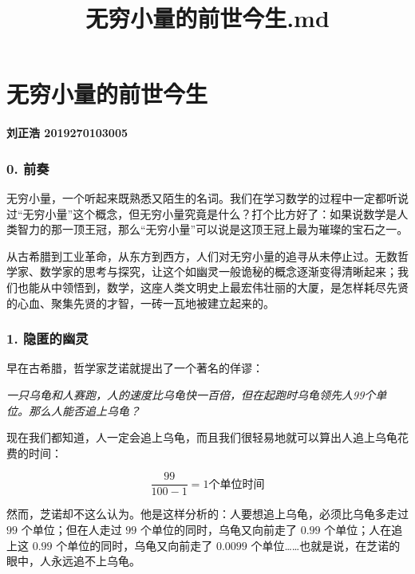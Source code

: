 \documentclass[
]{article}
\title{无穷小量的前世今生.md}
\author{}
\date{}
\begin{document}
\maketitle

\hypertarget{header-n0}{%
\section{无穷小量的前世今生}\label{header-n0}}

\hypertarget{header-n2}{%
\paragraph{刘正浩 2019270103005}\label{header-n2}}

\hypertarget{header-n3}{%
\subsubsection{0. 前奏}\label{header-n3}}

无穷小量，一个听起来既熟悉又陌生的名词。我们在学习数学的过程中一定都听说过``无穷小量''这个概念，但无穷小量究竟是什么？打个比方好了：如果说数学是人类智力的那一顶王冠，那么``无穷小量''可以说是这顶王冠上最为璀璨的宝石之一。

从古希腊到工业革命，从东方到西方，人们对无穷小量的追寻从未停止过。无数哲学家、数学家的思考与探究，让这个如幽灵一般诡秘的概念逐渐变得清晰起来；我们也能从中领悟到，数学，这座人类文明史上最宏伟壮丽的大厦，是怎样耗尽先贤的心血、聚集先贤的才智，一砖一瓦地被建立起来的。

\hypertarget{header-n6}{%
\subsubsection{1. 隐匿的幽灵}\label{header-n6}}

早在古希腊，哲学家芝诺就提出了一个著名的佯谬：

\emph{一只乌龟和人赛跑，人的速度比乌龟快一百倍，但在起跑时乌龟领先人99个单位。那么人能否追上乌龟？}

现在我们都知道，人一定会追上乌龟，而且我们很轻易地就可以算出人追上乌龟花费的时间：

\[\frac{{99}}{{100 - 1}} = 1个单位时间\]

然而，芝诺却不这么认为。他是这样分析的：人要想追上乌龟，必须比乌龟多走过
\(99\) 个单位；但在人走过 \(99\) 个单位的同时，乌龟又向前走了 \(0.99\)
个单位；人在追上这 \(0.99\) 个单位的同时，乌龟又向前走了 \(0.0099\)
个单位\ldots\ldots 也就是说，在芝诺的眼中，人永远追不上乌龟。
\end{document}
